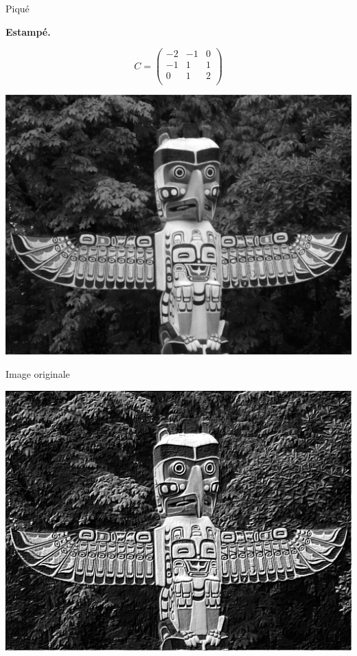 \documentclass[11pt,class=report,crop=false]{standalone}
\begin{document}
\begin{activite}
\begin{center}
\begin{minipage}{0.45\textwidth}
		Piqué
	\end{minipage}	
\end{center}

\bigskip

\textbf{Estampé.}

$$C = 
\begin{pmatrix}
-2&-1&0\\
-1&1&1\\
0&1&2\\
\end{pmatrix}$$


\begin{center}
	\begin{minipage}{0.45\textwidth}\center
		\includegraphics[scale=\myscale,scale=0.18]{png/totem}
		 
		Image originale
	\end{minipage}
	\begin{minipage}{0.45\textwidth}\center
		\includegraphics[scale=\myscale,scale=0.18]{png/totem_conv_estampe}
		

\end{minipage}
\end{center}
\end{activite}
\end{document}

